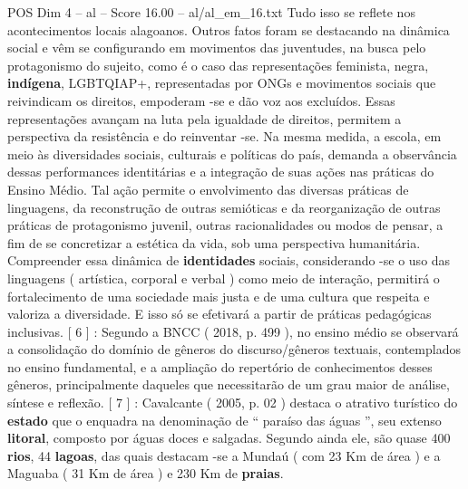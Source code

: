 \begin{textsample}{POS Dim 4 – al – Score 16.00 – al/al\_em\_16.txt}
Tudo isso se reflete nos acontecimentos locais alagoanos.
Outros fatos foram se destacando na dinâmica social e vêm se configurando em movimentos das juventudes, na busca pelo protagonismo do sujeito, como é o caso das representações feminista, negra, \textbf{indígena}, LGBTQIAP+, representadas por ONGs e movimentos sociais que reivindicam os direitos, empoderam -se e dão voz aos excluídos.
Essas representações avançam na luta pela igualdade de direitos, permitem a perspectiva da resistência e do reinventar -se.
Na mesma medida, a escola, em meio às diversidades sociais, culturais e políticas do país, demanda a observância dessas performances identitárias e a integração de suas ações nas práticas do Ensino Médio.
Tal ação permite o envolvimento das diversas práticas de linguagens, da reconstrução de outras semióticas e da reorganização de outras práticas de protagonismo juvenil, outras racionalidades ou modos de pensar, a fim de se concretizar a estética da vida, sob uma perspectiva humanitária.
Compreender essa dinâmica de \textbf{identidades} sociais, considerando -se o uso das linguagens ( artística, corporal e verbal ) como meio de interação, permitirá o fortalecimento de uma sociedade mais justa e de uma cultura que respeita e valoriza a diversidade.
E isso só se efetivará a partir de práticas pedagógicas inclusivas. [ 6 ] : Segundo a BNCC ( 2018, p. 499 ), no ensino médio se observará a consolidação do domínio de gêneros do discurso/gêneros textuais, contemplados no ensino fundamental, e a ampliação do repertório de conhecimentos desses gêneros, principalmente daqueles que necessitarão de um grau maior de análise, síntese e reflexão. [ 7 ] : Cavalcante ( 2005, p. 02 ) destaca o atrativo turístico do \textbf{estado} que o enquadra na denominação de “ paraíso das águas ”, seu extenso \textbf{litoral}, composto por águas doces e salgadas.
Segundo ainda ele, são quase 400 \textbf{rios}, 44 \textbf{lagoas}, das quais destacam -se a Mundaú ( com 23 Km de área ) e a Maguaba ( 31 Km de área ) e 230 Km de \textbf{praias}.

\end{textsample}
